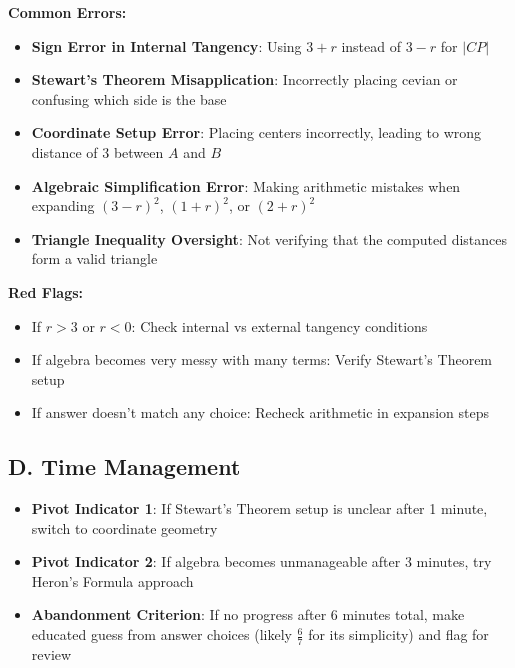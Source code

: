 \documentclass[]{article}
\begin{document}
\begin{solutionbox}
\textbf{Common Errors:}
\begin{itemize}[leftmargin=*]
    \item \textbf{Sign Error in Internal Tangency}: Using $3 + r$ instead of $3 - r$ for $|CP|$
    \item \textbf{Stewart's Theorem Misapplication}: Incorrectly placing cevian or confusing which side is the base
    \item \textbf{Coordinate Setup Error}: Placing centers incorrectly, leading to wrong distance of 3 between $A$ and $B$
    \item \textbf{Algebraic Simplification Error}: Making arithmetic mistakes when expanding $(3-r)^2$, $(1+r)^2$, or $(2+r)^2$
    \item \textbf{Triangle Inequality Oversight}: Not verifying that the computed distances form a valid triangle
\end{itemize}

\textbf{Red Flags:}
\begin{itemize}[leftmargin=*]
    \item If $r > 3$ or $r < 0$: Check internal vs external tangency conditions
    \item If algebra becomes very messy with many terms: Verify Stewart's Theorem setup
    \item If answer doesn't match any choice: Recheck arithmetic in expansion steps
\end{itemize}

\subsection*{D. Time Management}
\begin{itemize}[leftmargin=*]
    \item \textbf{Pivot Indicator 1}: If Stewart's Theorem setup is unclear after 1 minute, switch to coordinate geometry
    \item \textbf{Pivot Indicator 2}: If algebra becomes unmanageable after 3 minutes, try Heron's Formula approach
    \item \textbf{Abandonment Criterion}: If no progress after 6 minutes total, make educated guess from answer choices (likely $\frac{6}{7}$ for its simplicity) and flag for review
\end{itemize}
\end{solutionbox}
\end{document}
